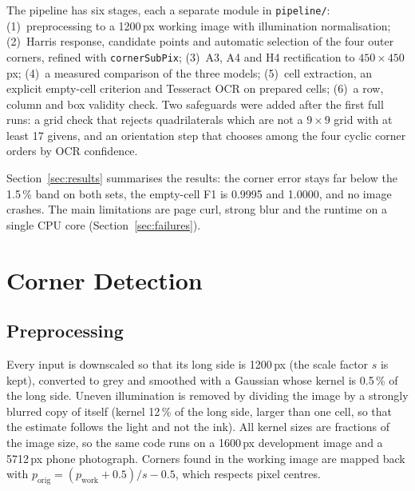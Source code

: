 \documentclass[conference]{IEEEtran}
\begin{document}
The pipeline has six stages, each a separate module in \texttt{pipeline/}:
(1)~preprocessing to a 1200\,px working image with illumination normalisation;
(2)~Harris response, candidate points and automatic selection of the four outer corners, refined with \texttt{cornerSubPix};
(3)~A3, A4 and H4 rectification to $450\times450$\,px;
(4)~a measured comparison of the three models;
(5)~cell extraction, an explicit empty-cell criterion and Tesseract OCR on prepared cells;
(6)~a row, column and box validity check.
Two safeguards were added after the first full runs: a grid check that rejects quadrilaterals which are not a $9\times9$ grid with at least 17 givens, and an orientation step that chooses among the four cyclic corner orders by OCR confidence.



Section~\ref{sec:results} summarises the results: the corner error stays far below the 1.5\,\% band on both sets, the empty-cell F1 is 0.9995 and 1.0000, and no image crashes. The main limitations are page curl, strong blur and the runtime on a single CPU core (Section~\ref{sec:failures}).

\section{Corner Detection}
\label{sec:corners}
\subsection{Preprocessing}
Every input is downscaled so that its long side is 1200\,px (the scale factor $s$ is kept), converted to grey and smoothed with a Gaussian whose kernel is 0.5\,\% of the long side. Uneven illumination is removed by dividing the image by a strongly blurred copy of itself (kernel 12\,\% of the long side, larger than one cell, so that the estimate follows the light and not the ink). All kernel sizes are fractions of the image size, so the same code runs on a 1600\,px development image and a 5712\,px phone photograph. Corners found in the working image are mapped back with $p_\text{orig} = (p_\text{work}+0.5)/s - 0.5$, which respects pixel centres.
\end{document}
